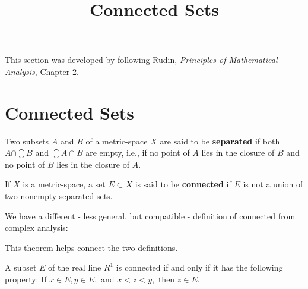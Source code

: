 \documentclass{article}
\title{Connected Sets}
\begin{document}
\begin{note}\label{connected-sets-reference-note}
This section was developed by following Rudin, \emph{Principles of Mathematical Analysis}, Chapter 2.
\end{note}

\section{Connected Sets}

\begin{definition}[Separated]
Two \@{subsets} $A$ and $B$ of a \@{metric-space} $X$ are said to be \textbf{separated} if both $A \cap \closure{B}$ and $\closure{A} \cap B$ are empty, i.e., if no point of $A$ lies in the \@{closure} of $B$ and no point of $B$ lies in the closure of $A.$
\end{definition}

\begin{definition}[Connected]
If $X$ is a \@{metric-space}, a set $E \subset X$ is said to be \textbf{connected} if $E$ is not a union of two nonempty \@{separated} sets.
\end{definition}

We have a different - less general, but compatible - definition of connected from complex analysis:


This theorem helps connect the two definitions.

\begin{theorem}\label{connected-sets-in-r1-are-intervals}
A subset $E$ of the real line $R^1$ is \@{connected} if and only if it has the following property: If $x \in E, y \in E,$ and $x < z < y,$ then $z \in E.$
\end{theorem}
\end{document}
